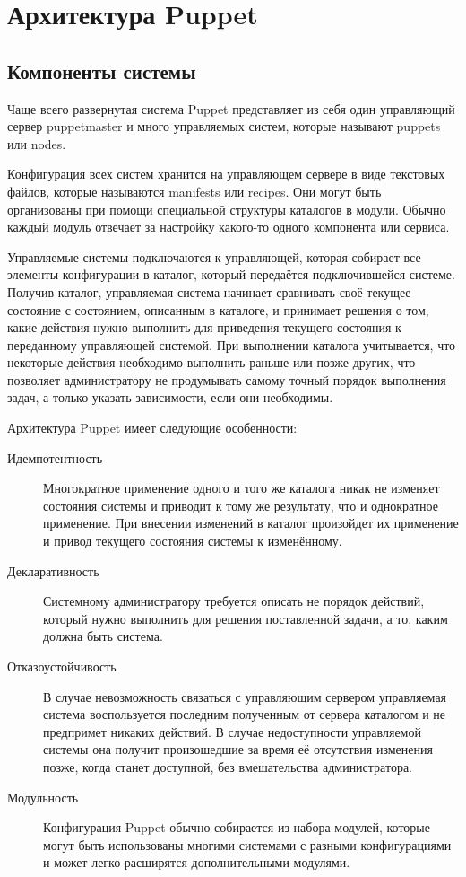 \chapter{Архитектура Puppet}

\section{Компоненты системы}

Чаще всего развернутая система Puppet представляет из себя один управляющий сервер puppetmaster и много управляемых систем, которые называют puppets или nodes.

Конфигурация всех систем хранится на управляющем сервере в виде текстовых файлов, которые называются manifests или recipes. Они могут быть организованы при помощи специальной структуры каталогов в модули. Обычно каждый модуль отвечает за настройку какого-то одного компонента или сервиса.
	
Управляемые системы подключаются к управляющей, которая собирает все элементы конфигурации в каталог, который передаётся подключившейся системе. Получив каталог, управляемая система начинает сравнивать своё текущее состояние с состоянием, описанным в каталоге, и принимает решения о том, какие действия нужно выполнить для приведения текущего состояния к переданному управляющей системой. При выполнении каталога учитывается, что некоторые действия необходимо выполнить раньше или позже других, что позволяет администратору не продумывать самому точный порядок выполнения задач, а только указать зависимости, если они необходимы.  

Архитектура Puppet имеет следующие особенности:

\begin{description}
\item[Идемпотентность] Многократное применение одного и того же каталога никак не изменяет состояния системы и приводит к тому же результату, что и однократное применение. При внесении изменений в каталог произойдет их применение и привод текущего состояния системы к изменённому.
\item[Декларативность] Системному администратору требуется описать не порядок действий, который нужно выполнить для решения поставленной задачи, а то, каким должна быть система.
\item[Отказоустойчивость] В случае невозможность связаться с управляющим сервером управляемая система воспользуется последним полученным от сервера каталогом и не предпримет никаких действий. В случае недоступности управляемой системы она получит произошедшие за время её отсутствия изменения позже, когда станет доступной, без вмешательства администратора.
\item[Модульность] Конфигурация Puppet обычно собирается из набора модулей, которые могут быть использованы многими системами с разными конфигурациями и может легко расширятся дополнительными модулями.
\end{description}


